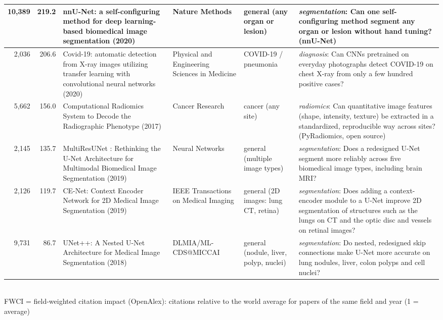 \documentclass[aspectratio=169]{beamer}
\begin{document}
\begin{frame}
\begin{adjustbox}{max totalsize={\textwidth}{0.74\textheight}}
\begin{tabular}{|r|r|>{\raggedright\arraybackslash}p{}|>{\raggedright\arraybackslash}p{}|>{\raggedright\arraybackslash}p{}|>{\raggedright\arraybackslash}p{}|}
10,389 & 219.2 & nnU-Net: a self-configuring method for deep learning-based biomedical image segmentation (2020) & Nature Methods & general (any organ or lesion) & \textit{segmentation}: Can one self-configuring method segment any organ or lesion without hand tuning? (nnU-Net) \\ \hline
2,036 & 206.6 & Covid-19: automatic detection from X-ray images utilizing transfer learning with convolutional neural networks (2020) & Physical and Engineering Sciences in Medicine & COVID-19 / pneumonia & \textit{diagnosis}: Can CNNs pretrained on everyday photographs detect COVID-19 on chest X-ray from only a few hundred positive cases? \\ \hline
5,662 & 156.0 & Computational Radiomics System to Decode the Radiographic Phenotype (2017) & Cancer Research & cancer (any site) & \textit{radiomics}: Can quantitative image features (shape, intensity, texture) be extracted in a standardized, reproducible way across sites? (PyRadiomics, open source) \\ \hline
2,145 & 135.7 & MultiResUNet : Rethinking the U-Net Architecture for Multimodal Biomedical Image Segmentation (2019) & Neural Networks & general (multiple image types) & \textit{segmentation}: Does a redesigned U-Net segment more reliably across five biomedical image types, including brain MRI? \\ \hline
2,126 & 119.7 & CE-Net: Context Encoder Network for 2D Medical Image Segmentation (2019) & IEEE Transactions on Medical Imaging & general (2D images: lung CT, retina) & \textit{segmentation}: Does adding a context-encoder module to a U-Net improve 2D segmentation of structures such as the lungs on CT and the optic disc and vessels on retinal images? \\ \hline
9,731 & 86.7 & UNet++: A Nested U-Net Architecture for Medical Image Segmentation (2018) & DLMIA/ML-CDS@MICCAI & general (nodule, liver, polyp, nuclei) & \textit{segmentation}: Do nested, redesigned skip connections make U-Net more accurate on lung nodules, liver, colon polyps and cell nuclei? \\ \hline
\end{tabular}
\end{adjustbox}
\\[1pt]
{\tiny FWCI = field-weighted citation impact (OpenAlex): citations relative to the world average for papers of the same field and year (1 = average)}
\end{frame}
\end{document}
